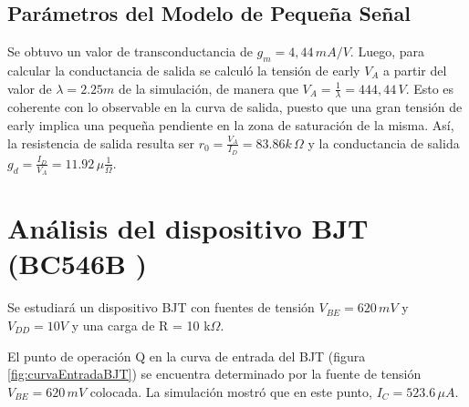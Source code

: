 \documentclass[conference]{IEEEtran} \IEEEoverridecommandlockouts
\begin{document}
    
    \subsection{Parámetros del Modelo de Pequeña Señal}
    Se obtuvo un valor de transconductancia de $g_m=4,44\,mA/V$. Luego, para calcular la conductancia de salida se calculó la tensión de early $V_A$ a partir del valor de $\lambda=2.25m$ de la simulación, de manera que $V_A=\frac{1}{\lambda}=444,44\,V$. Esto es coherente con lo observable en la curva de salida, puesto que una gran tensión de early implica una pequeña pendiente en la zona de saturación de la misma. Así, la resistencia de salida resulta ser $r_0=\frac{V_A}{I_D}=83.86k\,\Omega$ y la conductancia de salida $g_d=\frac{I_D}{V_A}=11.92\,\mu\frac{1}{\Omega}$.

\section{Análisis del dispositivo BJT (BC546B )}
    Se estudiará un dispositivo BJT con fuentes de tensión $V_{BE} = 620\,mV$ y $V_{DD}= 10 V$ y una carga de R = 10 k$ \Omega$.

    El punto de operación Q en la curva de entrada del BJT (figura \ref{fig:curvaEntradaBJT}) se encuentra determinado por la fuente de tensión $V_{BE}=620\,mV$ colocada. La simulación mostró que en este punto, $I_C=523.6\,\mu A$. 
    
\end{document}
